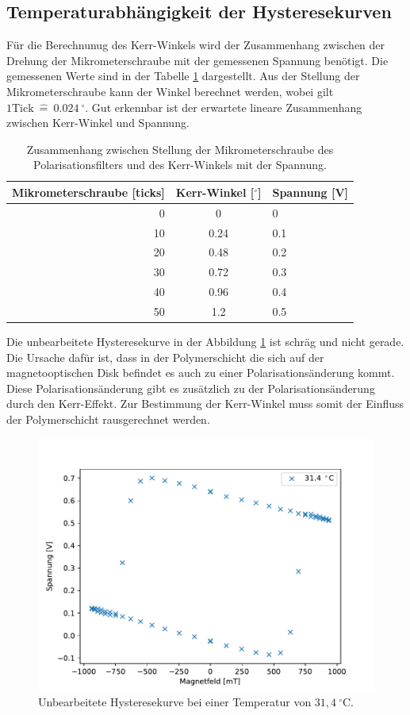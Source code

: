 \subsection{Temperaturabhängigkeit der Hysteresekurven}
Für die Berechnunug des Kerr-Winkels wird der Zusammenhang zwischen der Drehung der Mikrometerschraube mit der gemessenen Spannung benötigt. Die gemessenen Werte sind in der Tabelle \ref{tab:Mikrometerschraube} dargestellt. Aus der Stellung der Mikrometerschraube kann der Winkel berechnet werden, wobei gilt $ 1 \mathrm{Tick}\ \widehat{=}\ 0.024\ {}^\circ$. Gut erkennbar ist der erwartete lineare Zusammenhang zwischen Kerr-Winkel und Spannung.
\begin{table}[h]
    \centering
    \caption{
        Zusammenhang zwischen Stellung der Mikrometerschraube des Polarisationsfilters und  des Kerr-Winkels mit der Spannung.
        }
    \label{tab:Mikrometerschraube}
    \begin{tabular}{r|c|l}
    Mikrometerschraube [ticks] & Kerr-Winkel [${}^\circ$]& Spannung [V] \\\hline
    0  & 0 & 0
 \\
    10 & 0.24 & 0.1
 \\
    20 & 0.48 & 0.2
 \\
    30 & 0.72 & 0.3
 \\
    40 & 0.96 & 0.4
 \\
    50 & 1.2 & 0.5 \\   
    \end{tabular}
\end{table}
Die unbearbeitete Hysteresekurve in der Abbildung \ref{fig:hysterese_original} ist schräg und nicht gerade. Die Ursache dafür ist, dass in der Polymerschicht die sich auf der magnetooptischen Disk befindet es auch zu einer Polarisationsänderung kommt. Diese Polarisationsänderung gibt es zusätzlich zu der Polarisationsänderung durch den Kerr-Effekt. Zur Bestimmung der Kerr-Winkel muss somit der Einfluss der Polymerschicht rausgerechnet werden.  
\begin{figure}[H]
\centering
\includegraphics[scale=0.8]{../Messdaten/auswertung/hysterese_7_original.pdf}
\caption{ Unbearbeitete Hysteresekurve bei einer Temperatur von $31,4\ {}^\circ$C.}
\label{fig:hysterese_original}
\end{figure}


